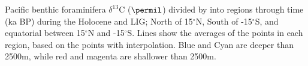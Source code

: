 Pacific benthic foraminifera $\delta^{13}$C ($\permil$) divided by into regions through time (ka BP) during the Holocene and LIG; North of 15$^\circ$N, South of -15$^\circ$S, and equatorial between 15$^\circ$N and -15$^\circ$S. Lines show the averages of the points in each region, based on the points with interpolation. Blue and Cyan are deeper than 2500m, while red and magenta are shallower than 2500m.